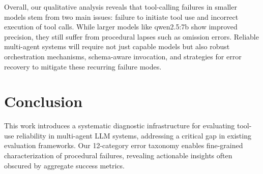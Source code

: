 \documentclass[conference]{IEEEtran}
\begin{document}
Overall, our qualitative analysis reveals that tool-calling failures in smaller models stem from two main issues: failure to initiate tool use and incorrect execution of tool calls. While larger models like qwen2.5:7b show improved precision, they still suffer from procedural lapses such as omission errors. Reliable multi-agent systems will require not just capable models but also robust orchestration mechanisms, schema-aware invocation, and strategies for error recovery to mitigate these recurring failure modes.




\section{Conclusion}
\label{sec:Conclusion}

This work introduces a systematic diagnostic infrastructure for evaluating tool-use reliability in multi-agent LLM systems, addressing a critical gap in existing evaluation frameworks. Our 12-category error taxonomy enables fine-grained characterization of procedural failures, revealing actionable insights often obscured by aggregate success metrics.
\end{document}
